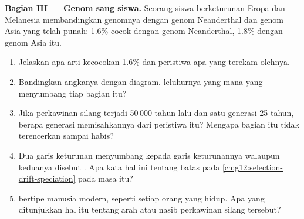 \begin{problem}
\medskip
\noindent\textbf{Bagian III --- Genom sang siswa.}
Seorang siswa berketurunan Eropa dan Melanesia membandingkan genomnya
dengan genom Neanderthal dan genom  Asia yang telah punah:
1.6\% cocok dengan genom Neanderthal, 1.8\% dengan genom Asia itu.
\begin{enumerate}[resume]
  \item Jelaskan apa arti kecocokan 1.6\% dan peristiwa apa yang
        terekam olehnya.
  \item Bandingkan angkanya dengan diagram.  leluhurnya yang
        mana yang menyumbang tiap bagian itu?
  \item Jika perkawinan silang terjadi 50\,000 tahun lalu dan satu
        generasi 25 tahun, berapa generasi memisahkannya dari
        peristiwa itu? Mengapa bagian itu tidak terencerkan sampai
        habis?
  \item Dua garis keturunan menyumbang  kepada garis keturunannya
        walaupun keduanya disebut . Apa kata hal ini tentang
        batas  pada \cref{ch:g12:selection-drift-speciation}
        pada masa itu?
  \item {}  bertipe manusia modern, seperti  setiap
        orang yang hidup. Apa yang ditunjukkan hal itu tentang arah
        atau nasib perkawinan silang tersebut?
\end{enumerate}


\end{problem}
